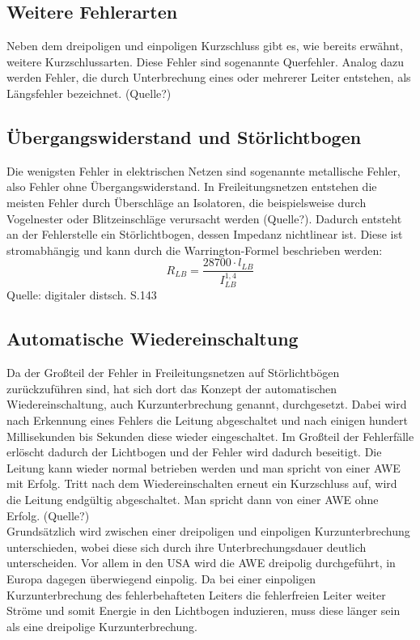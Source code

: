 \documentclass{scrartcl}
\begin{document}
\begin{onehalfspace}
\subsection{Weitere Fehlerarten}
Neben dem dreipoligen und einpoligen Kurzschluss gibt es, wie bereits erwähnt, weitere Kurzschlussarten. Diese Fehler sind sogenannte \glqq Querfehler\grqq{}. Analog dazu werden Fehler, die durch Unterbrechung eines oder mehrerer Leiter entstehen, als \glqq Längsfehler\grqq{} bezeichnet. (Quelle?)

\subsection{Übergangswiderstand und Störlichtbogen}
Die wenigsten Fehler in elektrischen Netzen sind sogenannte \glqq metallische Fehler\grqq, also Fehler ohne Übergangswiderstand. In Freileitungsnetzen entstehen die meisten Fehler durch Überschläge an Isolatoren, die beispielsweise durch Vogelnester oder Blitzeinschläge verursacht werden (Quelle?). Dadurch entsteht an der Fehlerstelle ein Störlichtbogen, dessen Impedanz nichtlinear ist. Diese ist stromabhängig und kann durch die Warrington-Formel beschrieben werden: \\

\begin{equation}
R_{LB} = \frac{28700 \cdot l_{LB}}{I_{LB}^{1,4}}
\end{equation}
Quelle: digitaler distsch. S.143

\subsection{Automatische Wiedereinschaltung}
Da der Großteil der Fehler in Freileitungsnetzen auf Störlichtbögen zurückzuführen sind, hat sich dort das Konzept der automatischen Wiedereinschaltung, auch Kurzunterbrechung genannt, durchgesetzt. Dabei wird nach Erkennung eines Fehlers die Leitung abgeschaltet und nach einigen hundert Millisekunden bis Sekunden diese wieder eingeschaltet. Im Großteil der Fehlerfälle erlöscht dadurch der Lichtbogen und der Fehler wird dadurch beseitigt. Die Leitung kann wieder normal betrieben werden und man spricht von einer \glqq AWE mit Erfolg\grqq. Tritt nach dem Wiedereinschalten erneut ein Kurzschluss auf, wird die Leitung endgültig abgeschaltet. Man spricht dann von einer \glqq AWE ohne Erfolg\grqq. (Quelle?) \\
Grundsätzlich wird zwischen einer dreipoligen und einpoligen Kurzunterbrechung unterschieden, wobei diese sich durch ihre Unterbrechungsdauer deutlich unterscheiden. Vor allem in den USA wird die AWE dreipolig durchgeführt, in Europa dagegen überwiegend einpolig. Da bei einer einpoligen Kurzunterbrechung des fehlerbehafteten Leiters die fehlerfreien Leiter weiter Ströme und somit Energie in den Lichtbogen induzieren, muss diese länger sein als eine dreipolige Kurzunterbrechung.


\end{onehalfspace}
\end{document}

